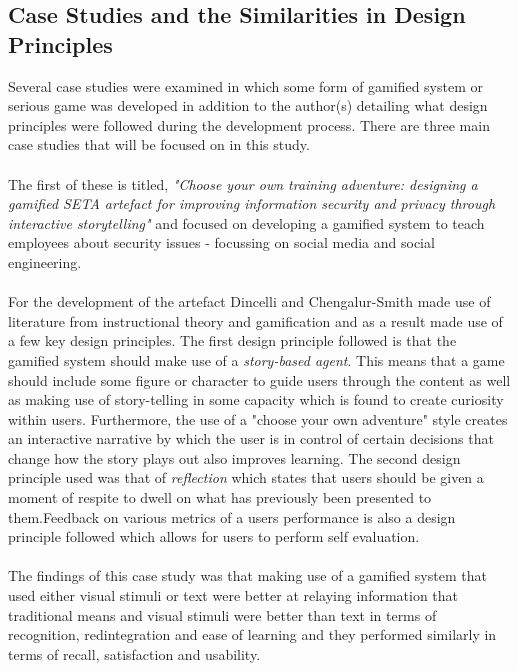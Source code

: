 \documentclass[conference]{IEEEtran}
\begin{document}
\subsection{Case Studies and the Similarities in Design Principles}
Several case studies were examined in which some form of gamified system or serious game was developed in addition to the author(s) detailing what design principles were followed during the development process. There are three main case studies that will be focused on in this study\cite{Dincelli2020,Sheng2007,allers2021children}.
\\\\
The first of these is titled, \textit{"Choose your own training adventure: designing a gamified SETA artefact for improving information security and privacy through interactive storytelling"} and focused on developing a gamified system to teach employees about security issues - focussing on social media and social engineering\cite{Dincelli2020}. 
\\\\
For the development of the artefact Dincelli and Chengalur-Smith\cite{Dincelli2020} made use of literature from instructional theory and gamification and as a result made use of a few key design principles. The first design principle followed is that the gamified system should make use of a \textit{story-based agent}\cite{Dincelli2020}. This means that a game should include some figure or character to guide users through the content as well as making use of story-telling in some capacity which is found to create curiosity within users\cite{Dincelli2020, Kapp2012a}. Furthermore, the use of a "choose your own adventure" style creates an interactive narrative by which the user is in control of certain decisions that change how the story plays out also improves learning\cite{Dincelli2020}. The second design principle used was that of \textit{reflection} which states that users should be given a moment of respite to dwell on what has previously been presented to them\cite{Dincelli2020,Sheng2007}.Feedback on various metrics of a users performance is also a design principle followed which allows for users to perform self evaluation\cite{Dincelli2020}. 
\\\\
The findings of this case study was that making use of a gamified system that used either visual stimuli or text were better at relaying information that traditional means and visual stimuli were better than text in terms of recognition, redintegration and ease of learning and they performed similarly in terms of recall, satisfaction and usability\cite{Dincelli2020}.
\end{document}
